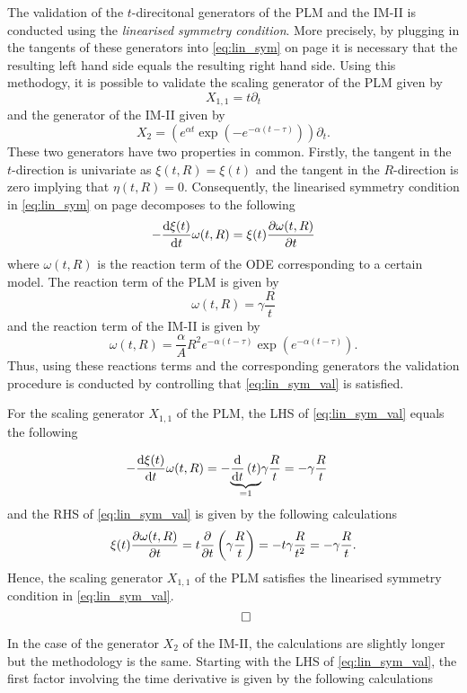 The validation of the $t$-direcitonal generators of the PLM and the IM-II is conducted using the \textit{linearised symmetry condition}. More precisely, by plugging in the tangents of these generators into \eqref{eq:lin_sym} on page \pageref{eq:lin_sym} it is necessary that the resulting left hand side equals the resulting right hand side. Using this methodogy, it is possible to validate the scaling generator of the PLM given by
$$X_{1,1}=t\partial_t$$
and the generator of the IM-II given by
$$X_{2}=\left(e^{\alpha t}\exp\left(-e^{-\alpha(t-\tau)}\right)\right)\partial_t.$$
These two generators have two properties in common. Firstly, the tangent in the $t$-direction is univariate as $\xi(t,R)=\xi(t)$ and the tangent in the $R$-direction is zero implying that $\eta(t,R)=0$. Consequently, the linearised symmetry condition in \eqref{eq:lin_sym} on page \pageref{eq:lin_sym} decomposes to the following
\begin{equation}
-\dv{\xi(t)}{t}\omega(t,R)=\xi(t)\pdv{\omega(t,R)}{t}
  \label{eq:lin_sym_val}
\end{equation}
where $\omega(t,R)$ is the reaction term of the ODE corresponding to a certain model. The reaction term of the PLM is given by
$$\omega(t,R)=\gamma\dfrac{R}{t}$$
and the reaction term of the IM-II is given by
$$\omega(t,R)=\frac{\alpha}{A}R^2e^{-\alpha(t-\tau)}\exp\left(e^{-\alpha(t-\tau)}\right).$$
Thus, using these reactions terms and the corresponding generators the validation procedure is conducted by controlling that \eqref{eq:lin_sym_val} is satisfied.

For the scaling generator $X_{1,1}$ of the PLM, the LHS of \eqref{eq:lin_sym_val} equals the following

\begin{align*}
  -\dv{\xi(t)}{t}\omega(t,R)&=-\underset{=1}{\underbrace{\dv{}{t}\left(t\right)}}\gamma\dfrac{R}{t}=-\gamma\dfrac{R}{t}
\end{align*}
and the RHS of \eqref{eq:lin_sym_val} is given by the following calculations
\begin{align*}
  \xi(t)\pdv{\omega(t,R)}{t}&=t\pdv{}{t}\left(\gamma\dfrac{R}{t}\right)=-t\gamma\dfrac{R}{t^2}=-\gamma\dfrac{R}{t}.\\
\end{align*}
Hence, the scaling generator $X_{1,1}$ of the PLM satisfies the linearised symmetry condition in \eqref{eq:lin_sym_val}.
$$\qed$$

In the case of the generator $X_2$ of the IM-II, the calculations are slightly longer but the methodology is the same. Starting with the LHS of \eqref{eq:lin_sym_val}, the first factor involving the time derivative is given by the following calculations

